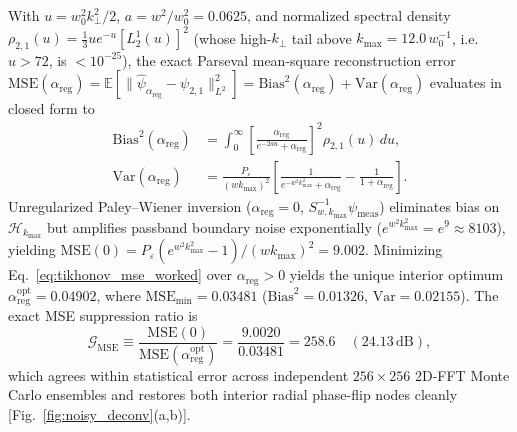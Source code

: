 \documentclass[aps,pra,reprint,nofootinbib,floatfix,longbibliography]{revtex4-2}
\newcommand{\norm}[1]{\lVert #1 \rVert}
\begin{document}
With $u = w_0^2 k_\perp^2/2$, $a = w^2/w_0^2 = 0.0625$, and normalized spectral density $\rho_{2,1}(u) = \frac{1}{3}u e^{-u}[L_2^1(u)]^2$ (whose high-$k_\perp$ tail above $k_{\max} = 12.0\,w_0^{-1}$, i.e.\ $u > 72$, is $< 10^{-25}$), the exact Parseval mean-square reconstruction error $\mathrm{MSE}(\alpha_{\mathrm{reg}}) = \mathbb{E}[\norm{\hat{\psi}_{\alpha_{\mathrm{reg}}} - \psi_{2,1}}_{L^2}^2] = \mathrm{Bias}^2(\alpha_{\mathrm{reg}}) + \mathrm{Var}(\alpha_{\mathrm{reg}})$ evaluates in closed form to
\begin{align}
\mathrm{Bias}^2(\alpha_{\mathrm{reg}}) &= \int_0^\infty \left[\frac{\alpha_{\mathrm{reg}}}{e^{-2au} + \alpha_{\mathrm{reg}}}\right]^2 \rho_{2,1}(u)\,du, \nonumber \\
\mathrm{Var}(\alpha_{\mathrm{reg}}) &= \frac{P_\varepsilon}{(w k_{\max})^2} \left[\frac{1}{e^{-w^2 k_{\max}^2} + \alpha_{\mathrm{reg}}} - \frac{1}{1 + \alpha_{\mathrm{reg}}}\right].
\label{eq:tikhonov_mse_worked}
\end{align}
Unregularized Paley--Wiener inversion ($\alpha_{\mathrm{reg}} = 0$, $S_{w,k_{\max}}^{-1}\psi_{\mathrm{meas}}$) eliminates bias on $\mathcal{H}_{k_{\max}}$ but amplifies passband boundary noise exponentially ($e^{w^2 k_{\max}^2} = e^9 \approx 8103$), yielding $\mathrm{MSE}(0) = P_\varepsilon(e^{w^2 k_{\max}^2} - 1)/(w k_{\max})^2 = 9.002$. Minimizing Eq.~\eqref{eq:tikhonov_mse_worked} over $\alpha_{\mathrm{reg}} > 0$ yields the unique interior optimum $\alpha_{\mathrm{reg}}^{\mathrm{opt}} = 0.04902$, where $\mathrm{MSE}_{\min} = 0.03481$ ($\mathrm{Bias}^2 = 0.01326$, $\mathrm{Var} = 0.02155$). The exact MSE suppression ratio is
\begin{equation}
\mathcal{G}_{\mathrm{MSE}} \equiv \frac{\mathrm{MSE}(0)}{\mathrm{MSE}(\alpha_{\mathrm{reg}}^{\mathrm{opt}})} = \frac{9.0020}{0.03481} = 258.6 \quad (24.13\,\mathrm{dB}),
\label{eq:mse_ratio_exact}
\end{equation}
which agrees within statistical error across independent $256\times 256$ 2D-FFT Monte Carlo ensembles and restores both interior radial phase-flip nodes cleanly [Fig.~\ref{fig:noisy_deconv}(a,b)].
\end{document}
